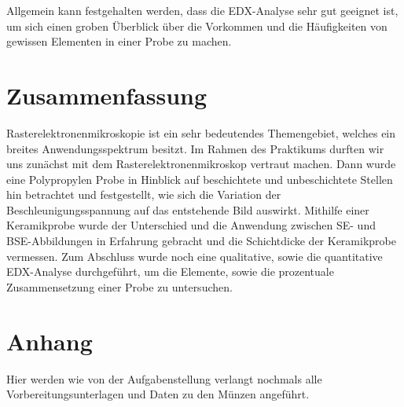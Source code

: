 \documentclass[12pt,english,ngerman]{scrartcl}
\begin{document}
Allgemein kann festgehalten werden, dass die EDX-Analyse sehr gut geeignet ist,
um sich einen groben Überblick über die Vorkommen und die Häufigkeiten von
gewissen Elementen in einer Probe zu machen.

\section{Zusammenfassung}

Rasterelektronenmikroskopie ist ein sehr bedeutendes Themengebiet, welches ein
breites Anwendungsspektrum besitzt. Im Rahmen des Praktikums durften wir uns
zunächst mit dem Rasterelektronenmikroskop vertraut machen. Dann wurde eine
Polypropylen Probe in Hinblick auf beschichtete und unbeschichtete Stellen hin
betrachtet und festgestellt, wie sich die Variation der Beschleunigungsspannung
auf das entstehende Bild auswirkt. Mithilfe einer Keramikprobe wurde der
Unterschied und die Anwendung zwischen SE- und BSE-Abbildungen in Erfahrung
gebracht und die Schichtdicke der Keramikprobe vermessen. Zum Abschluss wurde
noch eine qualitative, sowie die quantitative EDX-Analyse durchgeführt, um die
Elemente, sowie die prozentuale Zusammensetzung einer Probe zu untersuchen.

\section{Anhang}

Hier werden wie von der Aufgabenstellung verlangt nochmals alle
Vorbereitungsunterlagen und Daten zu den Münzen angeführt.





\newpage

\printbibliography{}
\end{document}
